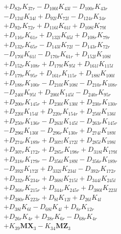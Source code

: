 \begin{multicols}{2}
\begin{align}
&+ D_{82r}K_{37r} - D_{100l}K_{43l} - D_{100r}K_{43r}  \nonumber \\
&- D_{124l}K_{34l} + D_{92l}K_{72l} - D_{124r}K_{34r}  \nonumber \\
&+ D_{92r}K_{72r} + D_{116l}K_{61l} + D_{108l}K_{79l}  \nonumber \\
&+ D_{116r}K_{61r} + D_{132l}K_{65l} + D_{108r}K_{79r}  \nonumber \\
&+ D_{132r}K_{65r} - D_{143l}K_{72l} - D_{143r}K_{72r}  \nonumber \\
&- D_{170l}K_{61l} - D_{170r}K_{61r} + D_{152l}K_{108l}  \nonumber \\
&+ D_{152r}K_{108r} + D_{179l}K_{95l} + D_{161l}K_{115l}  \nonumber \\
&+ D_{179r}K_{95r} + D_{161r}K_{115r} + D_{188l}K_{100l}  \nonumber \\
&+ D_{188r}K_{100r} - D_{210l}K_{108l} - D_{210r}K_{108r}  \nonumber \\
&- D_{240l}K_{95l} + D_{200l}K_{145l} - D_{240r}K_{95r}  \nonumber \\
&+ D_{200r}K_{145r} + D_{230l}K_{130l} + D_{230r}K_{130r}  \nonumber \\
&+ D_{220l}K_{154l} + D_{220r}K_{154r} + D_{250l}K_{136l}  \nonumber \\
&+ D_{250r}K_{136r} - D_{263l}K_{145l} - D_{263r}K_{145r}  \nonumber \\
&- D_{296l}K_{130l} - D_{296r}K_{130r} + D_{274l}K_{189l}  \nonumber \\
&+ D_{274r}K_{189r} + D_{307l}K_{172l} + D_{285l}K_{198l}  \nonumber \\
&+ D_{307r}K_{172r} + D_{285r}K_{198r} + D_{318l}K_{179l}  \nonumber \\
&+ D_{318r}K_{179r} - D_{356l}K_{189l} - D_{356r}K_{189r}  \nonumber \\
&- D_{392l}K_{172l} + D_{332l}K_{234l} - D_{392r}K_{172r}  \nonumber \\
&+ D_{332r}K_{234r} + D_{368l}K_{215l} + D_{344l}K_{245l}  \nonumber \\
&+ D_{368r}K_{215r} + D_{344r}K_{245r} + D_{380l}K_{223l}  \nonumber \\
&+ D_{380r}K_{223r} + D_{8l}K_{12l} + D_{26l}K_{4l}  \nonumber \\
&+ D_{38l}K_{6l} - D_{68l}K_{4l} + D_{8r}K_{12r}  \nonumber \\
&+ D_{26r}K_{4r} + D_{38r}K_{6r} - D_{68r}K_{4r}  \nonumber \\
&+ K_{39}\mathbf{MX}_3 - K_{34}\mathbf{MZ}_3 \nonumber \\

\end{align}
\end{multicols}
